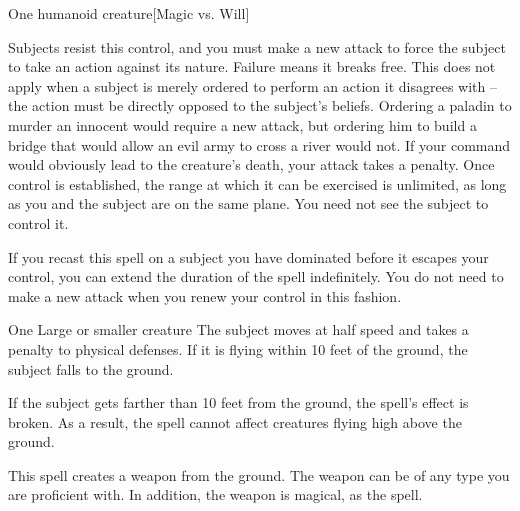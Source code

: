 \begin{spelltarget}{One humanoid creature}[Magic vs. Will]
    \par Subjects resist this control, and you must make a new attack to force the subject to take an action against its nature. Failure means it breaks free. This does not apply when a subject is merely ordered to perform an action it disagrees with -- the action must be directly opposed to the subject's beliefs. Ordering a paladin to murder an innocent would require a new attack, but ordering him to build a bridge that would allow an evil army to cross a river would not. If your command would obviously lead to the creature's death, your attack takes a  penalty. Once control is established, the range at which it can be exercised is unlimited, as long as you and the subject are on the same plane. You need not see the subject to control it.
    \par If you recast this spell on a subject you have dominated before it escapes your control, you can extend the duration of the spell indefinitely. You do not need to make a new attack when you renew your control in this fashion.
\end{spelltarget}

\begin{comment}
\subsubsection{E}
\end{comment}

\spellrng{\rngmed}
\spelldur{\durshort}
\begin{spelltarget}{One Large or smaller creature}
    \spelleffect The subject moves at half speed and takes a  penalty to physical defenses. If it is flying within 10 feet of the ground, the subject falls to the ground.
\end{spelltarget}
\spellnotes If the subject gets farther than 10 feet from the ground, the spell's effect is broken. As a result, the spell cannot affect creatures flying high above the ground.

\spelldur{\durlong \dismissable}
\spellline
\spelleffect This spell creates a weapon from the ground. The weapon can be of any type you are proficient with. In addition, the weapon is magical, as the  spell.

